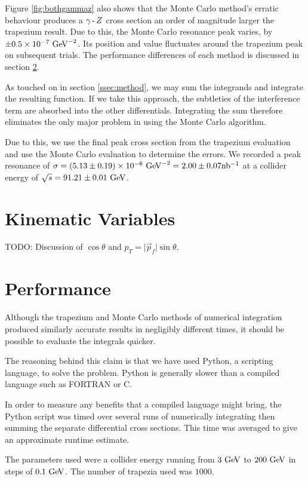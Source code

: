 \documentclass[]{article}
\providecommand{\e}[1]{\ensuremath{\times 10^{#1}}}
\begin{document}
Figure \ref{fig:bothgammaz} also shows that the Monte Carlo method's erratic behaviour produces a $\gamma\operatorname{-}Z $ cross section an order of magnitude larger the trapezium result. Due to this, the Monte Carlo resonance peak varies, by $\pm0.5\e{-7}\GeV^{-2}$. Its position and value fluctuates around the trapezium peak on subsequent trials. The performance differences of each method is discussed in section \ref{sec:performance}.

As touched on in section \ref{ssec:method}, we may sum the integrands and integrate the resulting function. If we take this approach, the subtleties of the interference term are absorbed into the other differentials. Integrating the sum therefore eliminates the only major problem in using the Monte Carlo algorithm.

Due to this, we use the final peak cross section from the trapezium evaluation and use the Monte Carlo evaluation to determine the errors. We recorded a peak resonance of $\sigma=(5.13\pm0.19)\e{-6}\GeV^{-2}=2.00\pm0.07\inb$ at a collider energy of $\sqrt{s}=91.21\pm0.01\GeV$.


\section{Kinematic Variables}\label{sec:variables}

TODO: Discussion of $\cos{\theta}$ and $p_{T} = \lvert\vec{p}_{f}\rvert\sin{\theta}$.


\section{Performance}\label{sec:performance}

Although the trapezium and Monte Carlo methods of numerical integration produced similarly accurate results in negligibly different times, it should be possible to evaluate the integrals quicker.

The reasoning behind this claim is that we have used Python, a scripting language, to solve the problem. Python is generally slower than a compiled language such as FORTRAN or C.

In order to measure any benefits that a compiled language might bring, the Python script was timed over several runs of numerically integrating then summing the separate differential cross sections. This time was averaged to give an approximate runtime estimate.

The parameters used were a collider energy running from $3\GeV$ to $200\GeV$ in steps of $0.1\GeV$. The number of trapezia used was $1000$.
\end{document}
